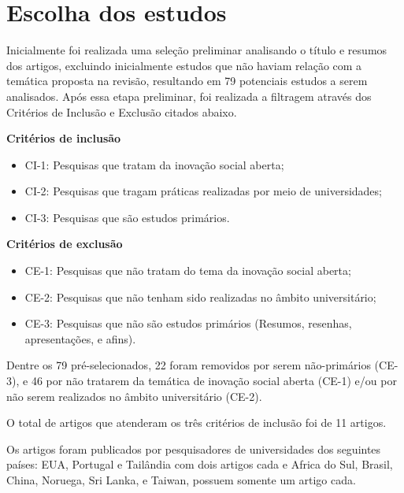 

\section{Escolha dos estudos}

Inicialmente foi realizada uma seleção preliminar analisando o título e resumos dos artigos, excluindo inicialmente estudos que não haviam relação com a temática proposta na revisão, resultando em 79 potenciais estudos a serem analisados. Após essa etapa preliminar, foi realizada a filtragem através dos Critérios de Inclusão e Exclusão citados abaixo.

\par\vspace{1\baselineskip}

\textbf{Critérios de inclusão}
\begin{itemize}
    \item CI-1: Pesquisas que tratam da inovação social aberta;
    \item CI-2: Pesquisas que tragam práticas realizadas por meio de universidades;
    \item CI-3: Pesquisas que são estudos primários.
\end{itemize}

\par\vspace{1\baselineskip}

\textbf{Critérios de exclusão}
\begin{itemize}
    \item CE-1: Pesquisas que não tratam do tema da inovação social aberta;
    \item CE-2: Pesquisas que não tenham sido realizadas no âmbito universitário;
    \item CE-3: Pesquisas que não são estudos primários (Resumos, resenhas, apresentações, e afins).
\end{itemize}

Dentre os 79 pré-selecionados, 22 foram removidos por serem não-primários (CE-3), e 46 por não tratarem da temática de inovação social aberta (CE-1) e/ou por não serem realizados no âmbito universitário (CE-2). 

O total de artigos que atenderam os três critérios de inclusão foi de 11 artigos.



Os artigos foram publicados por pesquisadores de universidades dos seguintes países: EUA, Portugal e Tailândia com dois artigos cada e Africa do Sul, Brasil, China, Noruega, Sri Lanka, e Taiwan, possuem somente um artigo cada.

